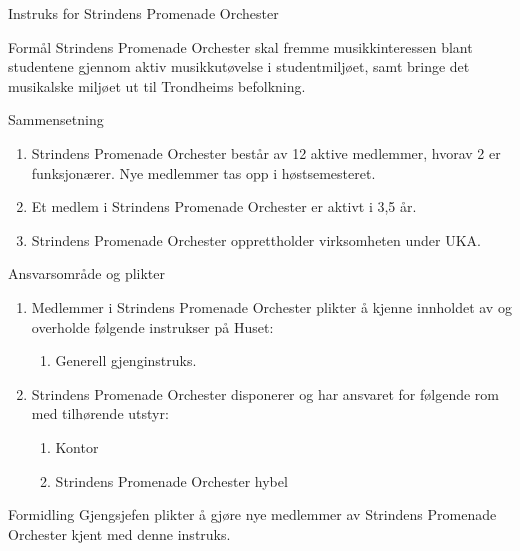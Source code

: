 \begin{instruks*}{Instruks for Strindens Promenade Orchester}
    \begin{instruksledd}{Formål}
        Strindens Promenade Orchester skal fremme musikkinteressen blant studentene gjennom aktiv
        musikkutøvelse i studentmiljøet, samt bringe det musikalske miljøet ut til Trondheims befolkning.
    \end{instruksledd}

    \begin{instruksledd}{Sammensetning}
        \begin{enumerate}
            \item Strindens Promenade Orchester består av 12 aktive medlemmer, hvorav 2 er funksjonærer. Nye medlemmer tas opp i høstsemesteret.
            \item Et medlem i Strindens Promenade Orchester er aktivt i 3,5 år.
            \item Strindens Promenade Orchester opprettholder virksomheten under UKA.
        \end{enumerate}
    \end{instruksledd}

    \begin{instruksledd}{Ansvarsområde og plikter}
        \begin{enumerate}
            \item Medlemmer i Strindens Promenade Orchester plikter å kjenne innholdet av og overholde følgende instrukser
                på Huset:
                \begin{enumerate}
                    \item Generell gjenginstruks.
                \end{enumerate}
        \item Strindens Promenade Orchester disponerer og har ansvaret for følgende rom med tilhørende utstyr:
            \begin{enumerate}
                \item Kontor
                \item Strindens Promenade Orchester hybel
            \end{enumerate}
        \end{enumerate}
    \end{instruksledd}

    \begin{instruksledd}{Formidling}
        Gjengsjefen plikter å gjøre nye medlemmer av Strindens Promenade Orchester kjent med denne instruks.
    \end{instruksledd}

\end{instruks*}

